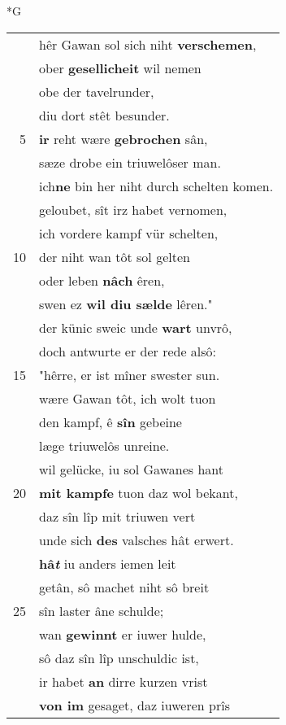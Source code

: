 \documentclass[8pt,a4paper,notitlepage]{article}
\begin{document}
\begin{table}[ht]
\begin{minipage}[t]{0.5\linewidth}
\small
\begin{center}*G
\end{center}
\begin{tabular}{rl}
 & hêr Gawan sol sich niht \textbf{verschemen},\\ 
 & ober \textbf{gesellicheit} wil nemen\\ 
 & obe der tavelrunder,\\ 
 & diu dort stêt besunder.\\ 
5 & \textbf{ir} reht wære \textbf{gebrochen} sân,\\ 
 & sæze drobe ein triuwelôser man.\\ 
 & ich\textbf{ne} bin her niht durch schelten komen.\\ 
 & geloubet, sît irz habet vernomen,\\ 
 & ich vordere kampf vür schelten,\\ 
10 & der niht wan tôt sol gelten\\ 
 & oder leben \textbf{nâch} êren,\\ 
 & swen ez \textbf{wil diu sælde} lêren."\\ 
 & der künic sweic unde \textbf{wart} unvrô,\\ 
 & doch antwurte er der rede alsô:\\ 
15 & "hêrre, er ist mîner swester sun.\\ 
 & wære Gawan tôt, ich wolt tuon\\ 
 & den kampf, ê \textbf{sîn} gebeine\\ 
 & læge triuwelôs unreine.\\ 
 & wil gelücke, iu sol Gawanes hant\\ 
20 & \textbf{mit kampfe} tuon daz wol bekant,\\ 
 & daz sîn lîp mit triuwen vert\\ 
 & unde sich \textbf{des} valsches hât erwert.\\ 
 & \textbf{hâ\textit{t}} iu anders iemen leit\\ 
 & getân, sô machet niht sô breit\\ 
25 & sîn laster âne schulde;\\ 
 & wan \textbf{gewinnt} er iuwer hulde,\\ 
 & sô daz sîn lîp unschuldic ist,\\ 
 & ir habet \textbf{an} dirre kurzen vrist\\ 
 & \textbf{von im} gesaget, daz iuweren prîs\\ 

\end{tabular}
\end{minipage}
\end{table}
\end{document}
